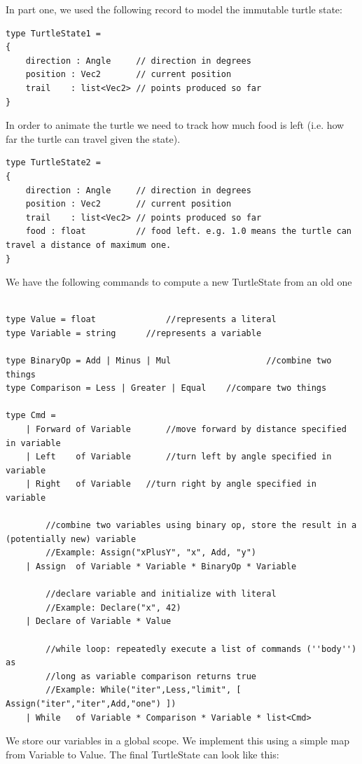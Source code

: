 \documentclass[a4paper]{article}
\begin{document}
\noindent In part one, we used the following record to model the immutable turtle state:
\begin{verbatim}
type TurtleState1 = 
{
    direction : Angle     // direction in degrees
    position : Vec2       // current position
    trail    : list<Vec2> // points produced so far
}
\end{verbatim}
\noindent In order to animate the turtle we need to track how much food is left (i.e. how far the turtle can travel given the state).
\begin{verbatim}
type TurtleState2 = 
{
    direction : Angle     // direction in degrees
    position : Vec2       // current position
    trail    : list<Vec2> // points produced so far
    food : float          // food left. e.g. 1.0 means the turtle can travel a distance of maximum one.
}
\end{verbatim}

\noindent We have the following commands to compute a new TurtleState from an old one

\begin{verbatim}

type Value = float				//represents a literal
type Variable = string		//represents a variable

type BinaryOp = Add | Minus | Mul					//combine two things
type Comparison = Less | Greater | Equal	//compare two things

type Cmd =
    | Forward of Variable		//move forward by distance specified in variable
    | Left    of Variable		//turn left by angle specified in variable
    | Right   of Variable   //turn right by angle specified in variable
		
		//combine two variables using binary op, store the result in a (potentially new) variable
		//Example: Assign("xPlusY", "x", Add, "y")
    | Assign  of Variable * Variable * BinaryOp * Variable  
		
		//declare variable and initialize with literal
		//Example: Declare("x", 42)
    | Declare of Variable * Value			
		
		//while loop: repeatedly execute a list of commands (''body'') as 
		//long as variable comparison returns true
		//Example: While("iter",Less,"limit", [ Assign("iter","iter",Add,"one") ])
    | While   of Variable * Comparison * Variable * list<Cmd>
\end{verbatim}

\noindent We store our variables in a global scope. We implement this using a simple map from Variable to Value. The final TurtleState can look like this:
\end{document}
